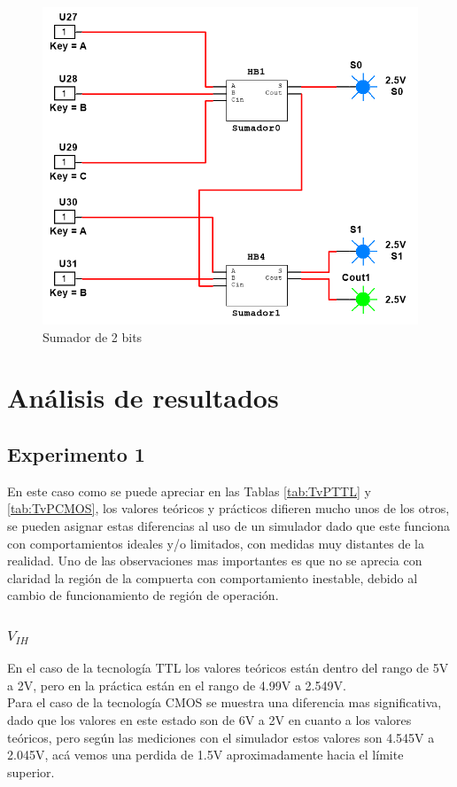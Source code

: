 \documentclass[journal]{IEEEtran}
\begin{document}
	\begin{figure}[!htb]
		\centering
		\includegraphics[scale = 0.4]{img/Sumador2B.png}
		\caption{Sumador de 2 bits}
		\label{fig:Sumador2B}
	\end{figure}
	
	\section{Análisis de resultados}
	\subsection{Experimento 1}
	En este caso como se puede apreciar en las Tablas \ref{tab:TvPTTL} y \ref{tab:TvPCMOS}, los valores teóricos y prácticos difieren mucho unos de los otros, se pueden asignar estas diferencias al uso de un simulador dado que este funciona con comportamientos ideales y/o limitados, con medidas muy distantes de la realidad. Uno de las observaciones mas importantes es que no se aprecia con claridad la región de la compuerta con comportamiento inestable, debido al cambio de funcionamiento de región de operación.
	
	\subsubsection{$V_{IH}$}
	En el caso de la tecnología TTL los valores teóricos están dentro del rango de 5V a 2V, pero en la práctica están en el rango de 4.99V a 2.549V. 
	\\
	Para el caso de la tecnología CMOS se muestra una diferencia mas significativa, dado que los valores en este estado son de 6V a 2V en cuanto a los valores teóricos, pero según las mediciones con el simulador estos valores son 4.545V a 2.045V, acá vemos una perdida de 1.5V aproximadamente hacia el límite superior. 
	
\end{document}

